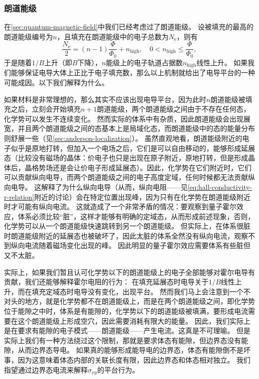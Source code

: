 \subsubsection{朗道能级}

在\autoref{sec:quantum-magnetic-field}中我们已经考虑过了朗道能级。
设被填充的最高的朗道能级编号为$n$，且填充在朗道能级中的电子总数为$N_\text{e}$，则有
\[
    \frac{N_\text{e}}{2} = (n-1) \frac{\Phi}{\Phi_0} + n_\text{high}, \quad 0 < n_\text{high} \leq \frac{\Phi}{\Phi_0},
\]
于是随着$1/B$上升（即$B$下降），$n$能级上的电子轨道占据数$n_\text{high}$线性上升。
如果我们能够保证电导大体上正比于电子填充数，那么以上机制就给出了电导平台的一种可能成因。以下我们解释为什么。

如果材料是非常理想的，那么其实不应该出现电导平台，因为此时$n$朗道能级被填充之后，立刻会开始填充$n+1$朗道能级，两个朗道能级之间由于不存在任何态，化学势可以发生不连续变化。
然而实际的体系中有杂质，因此朗道能级会出现展宽，并且两个朗道能级之间的态基本上是局域化态，而朗道能级中的态的能量分布则舒展一些（见\autoref{sec:anderson-localization}）。
虽然直观地看，朗道能级附近的电子似乎是原地打转，但加入一个电场之后，它们是可以自由移动的，能够形成延展态（比较没有磁场的晶体：价电子也只是出现在原子附近，原地打转，但是形成晶体后，晶格势场还是会让价电子形成延展态）。因此，化学势在它们附近时，它们可以贡献纵向电导，而两个朗道能级之间的电子高度定域，任何时候都无法贡献纵向电导。
这解释了为什么纵向电导（从而，纵向电阻——见\eqref{eq:hall-conductivity-r-relation}附近的讨论）会在特定位置出现峰，因为只有在化学势在朗道能级附近时才可能有纵向电流。
这就造成了一个非常矛盾的情况：要观察到量子霍尔效应，体系必须比较“脏”，这样才能够有明确的定域态，从而形成前述现象，否则，化学势可以从一个朗道能级快速跳转到另一个朗道能级。
但实际上，在体系很脏时朗道能级附近的延展态也被破坏了，因此太脏的体系全然没有纵向电流，观察不到纵向电流随着磁场变化出现的峰。
因此明显的量子霍尔效应需要体系有些脏但又不太脏。

实际上，如果我们暂且认可化学势以下的朗道能级上的电子全部能够对霍尔电导有贡献，我们还能够解释霍尔电阻的行为：
在填充延展态时电导关于$1/B$线性上升，而在填充定域态时电导没有变化，出现平台。
然而我们马上会注意到一个不对头的地方，就是化学势都不在朗道能级上，而是在两个朗道能级之间，即化学势位于能隙之中时，体系是有能隙的，化学势以下的朗道能级被填满，要形成电流需要在这个朗道能级上形成空穴，因此需要消耗有限大的能量。
因此，我们实际上是在要求有能隙的电子模式——朗道能级——产生电流。这真是不可理喻。
但是实际上我们有一种方法绕过这个限制，那就是要求体态有能隙，但边界态没有能隙，从而边界态导电。
如果真的能够形成能导电的边界态，体态有能隙倒不是坏事，因为这意味着体态内部的关联长度有限，因此边界态和体态相对独立。
我们指望通过边界态电流来解释$\sigma_{xy}$的平台行为。

